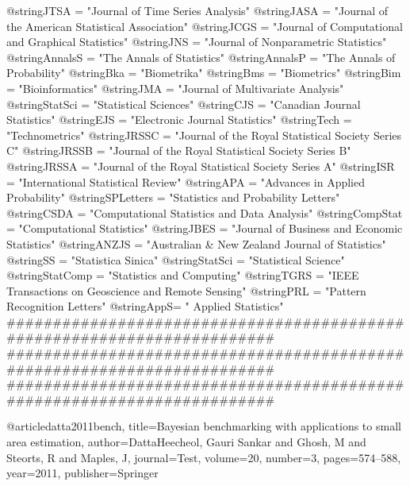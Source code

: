 @string{JTSA = "Journal of Time Series Analysis"}
@string{JASA = "Journal of the American Statistical Association"}
@string{JCGS = "Journal of Computational and Graphical Statistics"}
@string{JNS = "Journal of Nonparametric Statistics"}
@string{AnnalsS = "The Annals of Statistics"}
@string{AnnalsP = "The Annals of Probability"}
@string{Bka = "Biometrika"}
@string{Bms = "Biometrics"}
@string{Bim = "Bioinformatics"}
@string{JMA = "Journal of Multivariate Analysis"}
@string{StatSci = "Statistical Sciences"}
@string{CJS = "Canadian Journal Statistics"}
@string{EJS = "Electronic Journal Statistics"}
@string{Tech = "Technometrics"}
@string{JRSSC = "Journal of the Royal Statistical Society Series C"}
@string{JRSSB = "Journal of the Royal Statistical Society Series B"}
@string{JRSSA = "Journal of the Royal Statistical Society Series A"}
@string{ISR = "International Statistical Review"}
@string{APA = "Advances in Applied Probability"}
@string{SPLetters = "Statistics and Probability Letters"}
@string{CSDA = "Computational Statistics and Data Analysis"}
@string{CompStat = "Computational Statistics"}
@string{JBES = "Journal of Business and Economic Statistics"}
@string{ANZJS = "Australian \& New Zealand Journal of Statistics"}
@string{SS = "Statistica Sinica"}
@string{StatSci = "Statistical Science"}
@string{StatComp = "Statistics and Computing"}
@string{TGRS = "IEEE Transactions on Geoscience and Remote Sensing"}
@string{PRL = "Pattern Recognition Letters"}
@string{AppS= " Applied Statistics"}
########################################################################
########################################################################
########################################################################

@article{datta2011bench,
  title={Bayesian benchmarking with applications to small area estimation},
  author={DattaHeecheol, Gauri Sankar and Ghosh, M and Steorts, R and Maples, J},
  journal={Test},
  volume={20},
  number={3},
  pages={574--588},
  year={2011},
  publisher={Springer}
}